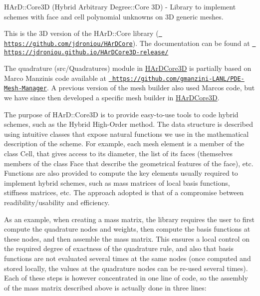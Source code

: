 HAr\+D\+::\+Core3D (Hybrid Arbitrary Degree\+::\+Core 3D) -\/ Library to implement schemes with face and cell polynomial unknowns on 3D generic meshes.

This is the 3D version of the HAr\+D\+::\+Core library (\href{https://github.com/jdroniou/HArDCore}{\texttt{ https\+://github.\+com/jdroniou/\+HAr\+DCore}}). The documentation can be found at \href{https://jdroniou.github.io/HArDCore3D-release/}{\texttt{ https\+://jdroniou.\+github.\+io/\+HAr\+DCore3\+D-\/release/}}

The quadrature (src/\+Quadratures) module in \mbox{\hyperlink{namespaceHArDCore3D}{HAr\+DCore3D}} is partially based on Marco Manzini\textquotesingle{}s code available at \href{https://github.com/gmanzini-LANL/PDE-Mesh-Manager}{\texttt{ https\+://github.\+com/gmanzini-\/\+LANL/\+PDE-\/\+Mesh-\/\+Manager}}. A previous version of the mesh builder also used Marco\textquotesingle{}s code, but we have since then developed a specific mesh builder in \mbox{\hyperlink{namespaceHArDCore3D}{HAr\+DCore3D}}.

The purpose of HAr\+D\+::\+Core3D is to provide easy-\/to-\/use tools to code hybrid schemes, such as the Hybrid High-\/\+Order method. The data structure is described using intuitive classes that expose natural functions we use in the mathematical description of the scheme. For example, each mesh element is a member of the class \textquotesingle{}Cell\textquotesingle{}, that gives access to its diameter, the list of its faces (themselves members of the class \textquotesingle{}Face\textquotesingle{} that describe the geometrical features of the face), etc. Functions are also provided to compute the key elements usually required to implement hybrid schemes, such as mass matrices of local basis functions, stiffness matrices, etc. The approach adopted is that of a compromise between readibility/usability and efficiency.

As an example, when creating a mass matrix, the library requires the user to first compute the quadrature nodes and weights, then compute the basis functions at these nodes, and then assemble the mass matrix. This ensures a local control on the required degree of exactness of the quadrature rule, and also that basis functions are not evaluated several times at the same nodes (once computed and stored locally, the values at the quadrature nodes can be re-\/used several times). Each of these steps is however concentrated in one line of code, so the assembly of the mass matrix described above is actually done in three lines\+:


